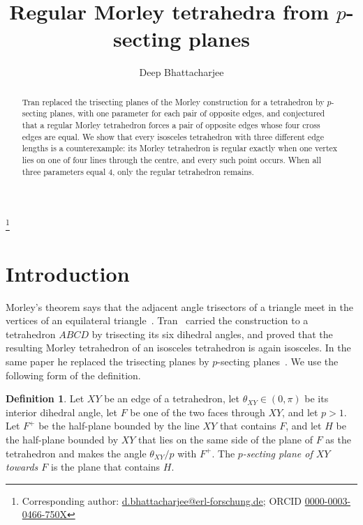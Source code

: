 \documentclass[11pt]{amsart}
\theoremstyle{definition}
\newtheorem{definition}[theorem]{Definition}
\theoremstyle{remark}
\numberwithin{equation}{section}
\begin{document}
\title{Regular Morley tetrahedra from $p$-secting planes}

\author{Deep Bhattacharjee}
\address{Formerly, Electro-Gravitational Space Propulsion Laboratory (EGSPL),\newline Bhubaneswar, Odisha 751030, India}
\thanks{Corresponding author: \href{mailto:d.bhattacharjee@erl-forschung.de}{d.bhattacharjee@erl-forschung.de}; ORCID \href{https://orcid.org/0000-0003-0466-750X}{\mbox{0000-0003-0466-750X}}}


\begin{abstract}
Tran replaced the trisecting planes of the Morley construction for a tetrahedron by $p$-secting planes, with one parameter for each pair of opposite edges, and conjectured that a regular Morley tetrahedron forces a pair of opposite edges whose four cross edges are equal. We show that every isosceles tetrahedron with three different edge lengths is a counterexample: its Morley tetrahedron is regular exactly when one vertex lies on one of four lines through the centre, and every such point occurs. When all three parameters equal $4$, only the regular tetrahedron remains.
\end{abstract}

\maketitle

\section{Introduction}

Morley's theorem says that the adjacent angle trisectors of a triangle meet in the vertices of an equilateral triangle~\cite{Mo,OB}. Tran~\cite{Tr21} carried the construction to a tetrahedron $ABCD$ by trisecting its six dihedral angles, and proved that the resulting Morley tetrahedron of an isosceles tetrahedron is again isosceles. In the same paper he replaced the trisecting planes by $p$-secting planes~\cite[Theorem~6]{Tr21}. We use the following form of the definition.

\begin{definition}\label{def:psect}
Let $XY$ be an edge of a tetrahedron, let $\theta_{XY}\in(0,\pi)$ be its interior dihedral angle, let $F$ be one of the two faces through $XY$, and let $p>1$. Let $F^+$ be the half-plane bounded by the line $XY$ that contains $F$, and let $H$ be the half-plane bounded by $XY$ that lies on the same side of the plane of $F$ as the tetrahedron and makes the angle $\theta_{XY}/p$ with $F^+$. The \emph{$p$-secting plane of $XY$ towards $F$} is the plane that contains $H$.
\end{definition}
\end{document}
